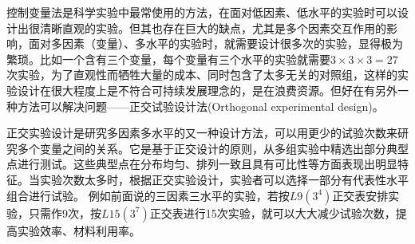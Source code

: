 控制变量法是科学实验中最常使用的方法，在面对低因素、低水平的实验时可以设计出很清晰直观的实验。但其也存在巨大的缺点，尤其是多个因素交互作用的影响，面对多因素（变量）、多水平的实验时，就需要设计很多次的实验，显得极为繁琐。比如一个含有三个变量，每个变量有三个水平的实验就需要$ 3\times 3 \times 3=27$次实验，为了直观性而牺牲大量的成本、同时包含了太多无关的对照组，这样的实验设计在很大程度上是不符合可持续发展理念的，是在浪费资源。但好在有另外一种方法可以解决问题——正交试验设计法(Orthogonal experimental design)。

正交实验设计是研究多因素多水平的又一种设计方法，可以用更少的试验次数来研究多个变量之间的关系。它是基于正交设计的原则，从多组实验中精选出部分典型点进行测试。这些典型点在分布均匀、排列一致且具有可比性等方面表现出明显特征\cite{wangxueshen}。当实验次数太多时，根据正交实验设计，实验者可以选择一部分有代表性水平组合进行试验。 例如前面说的三因素三水平的实验，若按$ L9(3^4) $正交表安排实验，只需作9次，按$ L15(3^7) $正交表进行15次实验，就可以大大减少试验次数，提高实验效率、材料利用率。


